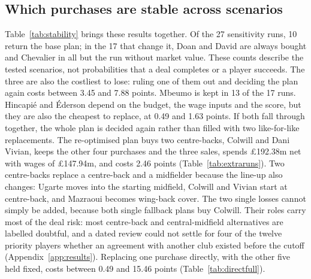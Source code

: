 \subsection{Which purchases are stable across scenarios}\label{sec:alternatives}

Table~\ref{tab:stability} brings these results together. Of the 27 sensitivity runs, 10 return the base plan; in the 17 that change it, Doan and David are always bought and Chevalier in all but the run without market value. These counts describe the tested scenarios, not probabilities that a deal completes or a player succeeds. The three are also the costliest to lose: ruling one of them out and deciding the plan again costs between 3.45 and 7.88 points. Mbeumo is kept in 13 of the 17 runs. Hincapié and Éderson depend on the budget, the wage inputs and the score, but they are also the cheapest to replace, at 0.49 and 1.63 points. If both fall through together, the whole plan is decided again rather than filled with two like-for-like replacements. The re-optimised plan buys two centre-backs, Colwill and Dani Vivian, keeps the other four purchases and the three sales, spends \pounds 192.38m net with wages of \pounds 147.94m, and costs 2.46 points (Table~\ref{tab:extraruns}). Two centre-backs replace a centre-back and a midfielder because the line-up also changes: Ugarte moves into the starting midfield, Colwill and Vivian start at centre-back, and Mazraoui becomes wing-back cover. The two single losses cannot simply be added, because both single fallback plans buy Colwill. Their roles carry most of the deal risk: most centre-back and central-midfield alternatives are labelled doubtful, and a dated review could not settle for four of the twelve priority players whether an agreement with another club existed before the cutoff (Appendix~\ref{app:results}). Replacing one purchase directly, with the other five held fixed, costs between 0.49 and 15.46 points (Table~\ref{tab:directfull}).

\begin{table}[!htbp]
\centering
\caption{Stability of the six purchases. Kept: sensitivity runs that change the base plan and still buy the player. Protected wages: whether the player is still bought when up to $\Gamma$ purchases may earn 10\% more. Cost if ruled out: fall in the objective when the purchase is blocked and the whole plan is decided again (Table~\ref{tab:fullplans}).}\label{tab:stability}
\end{table}
